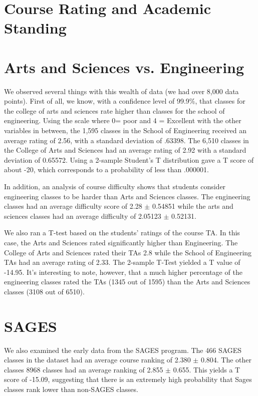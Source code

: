 \documentclass[12pt]{article}
\begin{document}
\section{Course Rating and Academic Standing}


\section{Arts and Sciences vs. Engineering}
We observed several things with this wealth of data (we had over 8,000 data points). First of all, we know, with a confidence level of 99.9\%, that classes for the college of arts and sciences rate higher than classes for the school of engineering. Using the scale where 0= poor and 4 = Excellent with the other variables in between, the 1,595 classes in the School of Engineering received an average rating of 2.56, with a standard deviation of .63398. The 6,510 classes in the College of Arts and Sciences had an average rating of 2.92 with a standard deviation of 0.65572. Using a 2-sample Student's T distribution gave a T score of about -20, which corresponds to a probability of less than .000001.

In addition, an analysis of course difficulty shows that students consider engineering classes to be harder than Arts and Sciences classes. The engineering classes had an average difficulty score of 2.28 $\pm$ 0.54851 while the arts and sciences classes had an average difficulty of 2.05123 $\pm$ 0.52131.

We also ran a T-test based on the students' ratings of the course TA. In this case, the Arts and Sciences rated significantly higher than Engineering. The College of Arts and Sciences rated their TAs 2.8 while the School of Engineering TAs had an average rating of 2.33. The 2-sample T-Test yielded a T value of -14.95. It's interesting to note, however, that a much higher percentage of the engineering classes rated the TAs (1345 out of 1595) than the Arts and Sciences classes (3108 out of 6510).

\section{SAGES}
We also examined the early data from the SAGES program. The 466 SAGES classes in the dataset had an average course ranking of 2.380 $\pm$ 0.804. The other classes 8968 classes had an average ranking of 2.855 $\pm$ 0.655. This yields a T score of -15.09, suggesting that there is an extremely high probability that Sages classes rank lower than non-SAGES classes.
\end{document}

